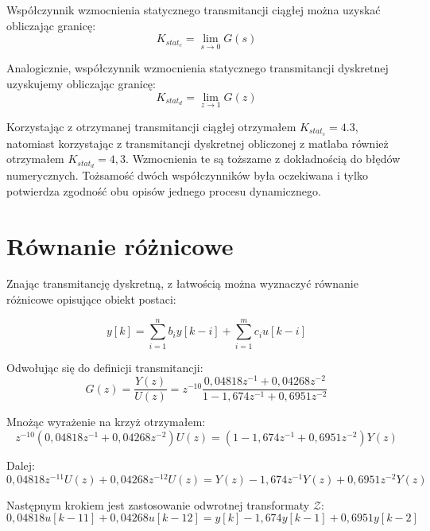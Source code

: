 \documentclass[a4paper,titlepage,11pt,floatssmall]{mwrep}
\begin{document}
\newpage

Współczynnik wzmocnienia statycznego transmitancji ciągłej można uzyskać obliczając granicę:
\begin{equation*}
K_{stat_{c}} = \lim_{s\to 0} G(s) 
\end{equation*} 

Analogicznie, współczynnik wzmocnienia statycznego transmitancji dyskretnej uzyskujemy obliczając granicę:
\begin{equation*}
K_{stat_{d}} = \lim_{z\to 1} G(z)
\end{equation*}

Korzystając z otrzymanej transmitancji ciągłej otrzymałem $K_{stat_{c}} = 4.3$, natomiast korzystając z transmitancji dyskretnej obliczonej z matlaba również otrzymałem $K_{stat_{d}} = 4,3$. Wzmocnienia te są toższame z dokładnością do błędów numerycznych. Tożsamość dwóch współczynników była oczekiwana i tylko potwierdza zgodność obu opisów jednego procesu dynamicznego.

\section{Równanie różnicowe}
Znając transmitancję dyskretną, z łatwością można wyznaczyć równanie różnicowe opisujące obiekt postaci:

\begin{equation*}
y[k] = \sum_{i=1}^{n}b_{i}y[k - i] + \sum_{i=1}^{m}c_{i}u[k - i]
\end{equation*}

Odwołując się do definicji transmitancji:
\begin{equation*}
G(z) = \frac{Y(z)}{U(z)} = z^{-10}\frac{0,04818z^{-1} + 0,04268z^{-2}}{1 - 1,674z^{-1} + 0,6951z^{-2}}
\end{equation*}

Mnożąc wyrażenie na krzyż otrzymałem:
\begin{equation*}
z^{-10}(0,04818z^{-1} + 0,04268z^{-2})U(z) =  (1 - 1,674z^{-1} + 0,6951z^{-2})Y(z)
\end{equation*}

Dalej:
\begin{equation*}
0,04818z^{-11}U(z) + 0,04268z^{-12}U(z) = Y(z) - 1,674z^{-1}Y(z) + 0,6951z^{-2}Y(z)
\end{equation*}

Następnym krokiem jest zastosowanie odwrotnej transformaty $\mathcal{Z}$:
\begin{equation*}
0,04818u[k-11] + 0,04268u[k-12] = y[k] - 1,674y[k-1] + 0,6951y[k-2]
\end{equation*}
\end{document}
